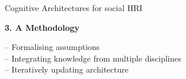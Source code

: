 \documentclass[compress]{beamer}
\begin{document}
{{\begin{frame}{Cognitive Architectures for social HRI}
\begin{multicols}{2}
    {\bf 3. A Methodology}

    {\scriptsize -- Formalising assumptions \\-- Integrating knowledge from multiple disciplines \\-- Iteratively updating architecture}


    \end{multicols}
\end{frame}
}


%


}
\end{document}
